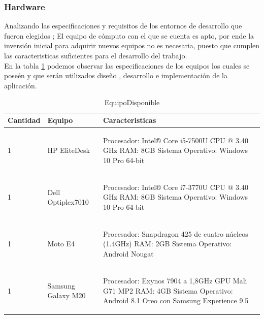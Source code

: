 \subsubsection{Hardware}

Analizando las especificaciones y requisitos de los entornos de desarrollo que fueron elegidos ; El equipo de cómputo con el que se cuenta es apto, por ende la inversión inicial para adquirir nuevos equipos no es necesaria, puesto que cumplen las caracteristicas suficientes para el desarrollo del trabajo.\\
En la tabla \ref{disenoEstructura:equipos} podemos observar las especificaciones de los equipos los cuales se poseén y que serán utilizados diseño , desarrollo e implementación de la aplicación.

\begin{table}[htbp]
		\begin{tabular}{|p{5cm}|p{5cm}|p{5cm}|}
			\hline
				Cantidad&Equipo&Caracteristicas\\
			\hline
			\hline
				1 & HP EliteDesk & \begin{UClist}
				\UCli Procesador: Intel® Core i5-7500U CPU $@$ 3.40 GHz
				\UCli RAM: 8GB
				\UCli Sistema Operativo: Windows 10 Pro 64-bit 
				\end{UClist} \\
			\hline
			\hline
				1 & Dell Optiplex7010  &\begin{UClist}
				\UCli Procesador: Intel® Core i7-3770U CPU $@$ 3.40 GHz
				\UCli RAM: 8GB
				\UCli Sistema Operativo: Windows 10 Pro 64-bit 
				\end{UClist} \\
			\hline
			\hline
				1 & Moto E4  &\begin{UClist}
				\UCli Procesador: Snapdragon 425 de cuatro núcleos (1.4GHz) 
				\UCli RAM: 2GB
				\UCli Sistema Operativo: Android Nougat
				\end{UClist} \\
			\hline
			\hline
				1 & Samsung Galaxy M20  &\begin{UClist}
				\UCli Procesador: Exynos 7904 a 1,8GHz GPU Mali G71 MP2
				\UCli RAM: 4GB
				\UCli Sistema Operativo: Android 8.1 Oreo con Samsung Experience 9.5
				\end{UClist} \\
			\hline
				\end{tabular}
				\caption{EquipoDisponible}
				\label{disenoEstructura:equipos}
				\end{table}


